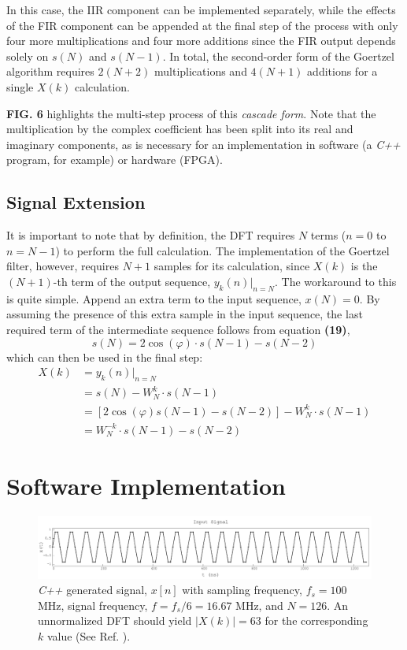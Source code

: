 \documentclass[reprint,amsmath,amssymb]{revtex4-2}
\begin{document}
In this case, the IIR component can be implemented separately, while the effects of the FIR component can be appended at the final step of the process with only four more multiplications and four more additions since the FIR output depends solely on $s(N)$ and $s(N-1)$. In total, the second-order form of the Goertzel algorithm requires $2(N + 2)$ multiplications and $4(N+1)$ additions for a single $X(k)$ calculation.

\textbf{FIG. 6} highlights the multi-step process of this \textit{cascade form}. Note that the multiplication by the complex coefficient has been split into its real and imaginary components, as is necessary for an implementation in software (a \textit{C++} program, for example) or hardware (FPGA).

\subsection{Signal Extension}

It is important to note that by definition, the DFT requires $N$ terms ($n=0$ to $n=N-1$) to perform the full calculation. The implementation of the Goertzel filter, however, requires $N+1$ samples for its calculation, since $X(k)$ is the $(N+1)$-th term of the output sequence, $y_k(n)|_{n=N}$. The workaround to this is quite simple. Append an extra term to the input sequence, $x(N) = 0$. By assuming the presence of this extra sample in the input sequence, the last required term of the intermediate sequence follows from equation \textbf{(19)}, 
\begin{equation}
    s(N) = 2\cos(\varphi)\cdot s(N-1) - s(N-2)
\end{equation}
which can then be used in the final step: 
\begin{align}
    X(k) & = y_k(n)|_{n=N} \\
    & = s(N) - W_N^k\cdot s(N-1) \nonumber \\
    & = [2\cos(\varphi) s(N-1) - s(N-2)] - W_N^k\cdot s(N-1)  \nonumber \\
    & = W_N^{-k}\cdot s(N-1) - s(N-2) \nonumber
\end{align}


\section{Software Implementation}

\begin{figure}
    \centering
    \includegraphics[width=\linewidth]{figs/sine_signal.png}
    \caption{\textit{C++} generated signal, $x[n]$ with sampling frequency, $f_s = 100$ MHz, signal frequency, $f = f_s/6 = 16.67$ MHz, and $N = 126$. An unnormalized DFT should yield $|X(k)| = 63$ for the corresponding $k$ value  (See Ref. \cite{github}).}
    \label{fig:7}
\end{figure}
\end{document}

